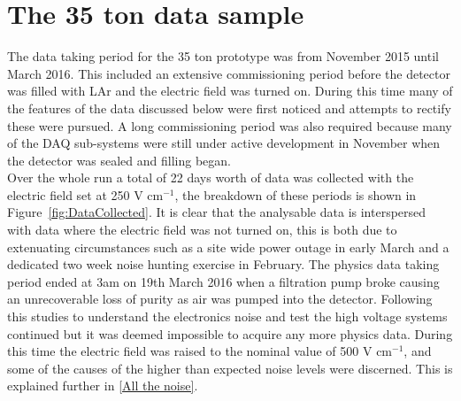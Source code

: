 
\chapter{The 35 ton data sample}  %

\graphicspath{{35tonData/Figs/PDF/}{35tonData/Figs/Raster/}{35tonData/Figs/Vector/}}

The data taking period for the 35 ton prototype was from November 2015 until March 2016. This included an extensive commissioning period before the detector was filled with LAr and the electric field was turned on. During this time many of the features of the data discussed below were first noticed and attempts to rectify these were pursued. A long commissioning period was also required because many of the DAQ sub-systems were still under active development in November when the detector was sealed and filling began.\\

Over the whole run a total of 22 days worth of data was collected with the electric field set at 250 V cm$^{-1}$, the breakdown of these periods is shown in Figure~\ref{fig:DataCollected}. It is clear that the analysable data is interspersed with data where the electric field was not turned on, this is both due to extenuating circumstances such as a site wide power outage in early March and a dedicated two week noise hunting exercise in February. The physics data taking period ended at 3am on 19th March 2016 when a filtration pump broke causing an unrecoverable loss of purity as air was pumped into the detector. Following this studies to understand the electronics noise and test the high voltage systems continued but it was deemed impossible to acquire any more physics data. During this time the electric field was raised to the nominal value of 500  V cm$^{-1}$, and some of the causes of the higher than expected noise levels were discerned. This is explained further in \ref{All the noise}. 

